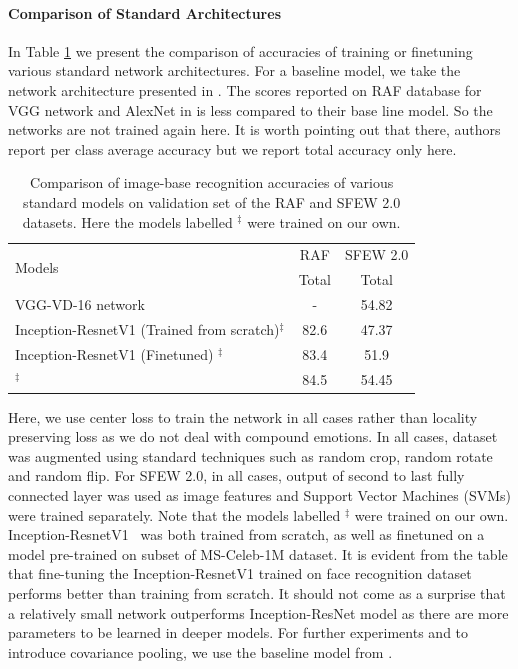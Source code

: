 \documentclass[10pt,twocolumn,letterpaper]{article}
\begin{document}
	\paragraph{Comparison of Standard Architectures}
		In Table \ref{table:detectionrate2} we present the comparison of accuracies of training or finetuning various standard network architectures. For a baseline model, we take the network architecture presented in \cite{dlpcnn}. The scores reported on RAF database for VGG network and AlexNet in \cite{dlpcnn} is less compared to their base line model. So the networks are not trained again here. It is worth pointing out that there, authors report per class average accuracy but we report total accuracy only here.
		\begin{table}
			\centering
			\begin{tabular}{lcc}
				\toprule
				\multirow{2}{*}{Models} &
				RAF & SFEW 2.0\\
				&Total & Total\\
				\midrule
				VGG-VD-16 network\cite{grimaces} & - & 54.82\\
				\makecell{Inception-ResnetV1\\  (Trained from scratch)$^\ddagger$ }&   82.6 & 47.37 \\
				\makecell{Inception-ResnetV1 \\ (Finetuned) $^\ddagger$   }& 83.4 & 51.9\\ 
				\makecell{Baseline Model} $^\ddagger$   &  84.5  & 54.45\\
				\bottomrule
			\end{tabular}
			\caption{Comparison of image-base recognition accuracies of various standard models on validation set of the RAF and SFEW 2.0 datasets. Here the models labelled $^\ddagger$ were trained on our own.}
			\label{table:detectionrate2}
		\end{table}
	Here, we use center loss\cite{centerloss} to train the network in all cases rather than locality preserving loss\cite{dlpcnn} as we do not deal with compound emotions. In all cases, dataset was augmented using standard techniques such as random crop, random rotate and random flip. For SFEW 2.0, in all cases, output of second to last fully connected layer was used as image features and Support Vector Machines (SVMs) were trained separately. Note that the models labelled $^\ddagger$ were trained on our own. Inception-ResnetV1~\cite{inceptionnet} was both trained from scratch, as well as finetuned on a model pre-trained on subset of MS-Celeb-1M dataset. It is evident from the table that fine-tuning the Inception-ResnetV1 trained on face recognition dataset performs better than training from scratch. It should not come as a surprise that a relatively small network outperforms Inception-ResNet model as there are more parameters to be learned in deeper models. For further experiments and to introduce covariance pooling, we use the baseline model from \cite{dlpcnn}.
\end{document}
